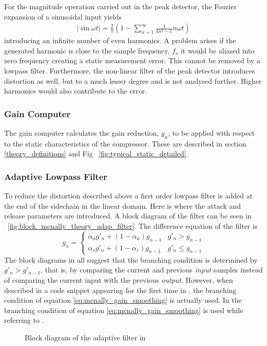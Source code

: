 \documentclass[../main2.tex]{subfiles}
\providecommand{\rootdir}{..}
\begin{document}
For the magnitude operation carried out in the peak detector, the Fourier expansion of a sinusoidal input yields
\begin{align}
\left |\sin{\omega t}\right | = \frac{2}{\pi}\left (1 - \sum_{n=1}^{\infty}\frac{4}{4n^2-1} n\omega t \right) 
\end{align}
introducing an infinite number of even harmonics. A problem arises if the generated harmonic is close to the sample frequency, $f_s$ it would be aliased into zero frequency creating a static measurement error. This cannot be removed by a lowpass filter. Furthermore, the non-linear filter of the peak detector introduces distortion as well, but to a much lesser degree\cite{mcnally1984dynamic} and is not analysed further. Higher harmonics would also contribute to the error. 
\subsubsection{Gain Computer}
The gain computer calculates the gain reduction, $g_n$, to be applied with respect to the static characteristics of the compressor. These are described in section \ref{theory_definitions} and Fig ~\ref{fig:typical_static_detailed}.
\subsubsection{Adaptive Lowpass Filter}
To reduce the distortion described above a first order lowpass filter is added at the end of the sidechain in the linear domain. Here is where the attack and release parameters are introduced. A block diagram of the filter can be seen in ~\ref{fig:block_mcnally_theory_adap_filter}. The difference equation of the filter is
\begin{equation}
g_n = \begin{cases}
    \alpha_{a} g'_n + (1-\alpha_{a}) g_{n-1} 	& g'_n > g_{n-1} \\
    \alpha_{r} g'_n + (1-\alpha_{r}) g_{n-1} 	& g'_n \leq g_{n-1}
\end{cases}
\label{eq:mcnally_gain_smoothing}
\end{equation}
The block diagrams in \cite{mcnally1984dynamic}\cite{dafx02}\cite{dagx11}\cite{zolzer1997digital}\cite{zolzer1997digital}\cite{zolzer2008digital} all suggest that the branching condition is determined by $g'_n > g'_{n-1}$, that is, by comparing the current and previous \emph{input} samples instead of comparing the current input with the previous \emph{output}. However, when described in a code snippet appearing for the first time in \cite{dafx11}, the branching condition of equation \eqref{eq:mcnally_gain_smoothing} is actually used. In \cite{bitzer2006parameter} the branching condition of equation \eqref{eq:mcnally_gain_smoothing} is used while referring to \cite{mcnally1984dynamic}\cite{dafx02}.
\begin{figure}
\centerline{}
\caption{Block diagram of the adaptive filter in \cite{mcnally1984dynamic}}
\label{fig:block_mcnally_theory_rms}
\end{figure}
\end{document}
